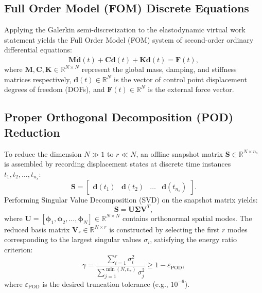 \subsection{Full Order Model (FOM) Discrete Equations}
Applying the Galerkin semi-discretization to the elastodynamic virtual work statement yields the Full Order Model (FOM) system of second-order ordinary differential equations:
\begin{equation}
    \bm{M} \ddot{\bm{d}}(t) + \bm{C} \dot{\bm{d}}(t) + \bm{K} \bm{d}(t) = \bm{F}(t),
    \label{eq:fom}
\end{equation}
where $\bm{M}, \bm{C}, \bm{K} \in \mathbb{R}^{N \times N}$ represent the global mass, damping, and stiffness matrices respectively, $\bm{d}(t) \in \mathbb{R}^N$ is the vector of control point displacement degrees of freedom (DOFs), and $\bm{F}(t) \in \mathbb{R}^N$ is the external force vector.

\subsection{Proper Orthogonal Decomposition (POD) Reduction}
To reduce the dimension $N \gg 1$ to $r \ll N$, an offline snapshot matrix $\bm{S} \in \mathbb{R}^{N \times n_s}$ is assembled by recording displacement states at discrete time instances $t_1, t_2, \dots, t_{n_s}$:
\begin{equation}
    \bm{S} = \begin{bmatrix} \bm{d}(t_1) & \bm{d}(t_2) & \dots & \bm{d}(t_{n_s}) \end{bmatrix}.
\end{equation}
Performing Singular Value Decomposition (SVD) on the snapshot matrix yields:
\begin{equation}
    \bm{S} = \bm{U} \bm{\Sigma} \bm{V}^T,
\end{equation}
where $\bm{U} = [\bm{\phi}_1, \bm{\phi}_2, \dots, \bm{\phi}_N] \in \mathbb{R}^{N \times N}$ contains orthonormal spatial modes. The reduced basis matrix $\bm{V}_r \in \mathbb{R}^{N \times r}$ is constructed by selecting the first $r$ modes corresponding to the largest singular values $\sigma_i$, satisfying the energy ratio criterion:
\begin{equation}
    \gamma = \frac{\sum_{i=1}^r \sigma_i^2}{\sum_{j=1}^{\min(N, n_s)} \sigma_j^2} \ge 1 - \varepsilon_{\text{POD}},
\end{equation}
where $\varepsilon_{\text{POD}}$ is the desired truncation tolerance (e.g., $10^{-6}$).


